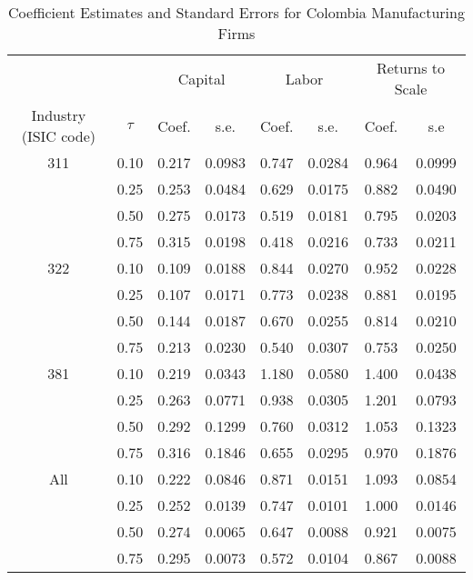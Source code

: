 \begin{table}[ht]
\centering
\caption{Coefficient Estimates and Standard Errors for Colombia Manufacturing Firms} 
\begin{tabular}{cccccccc}
  \hline\hline & & \multicolumn{2}{c}{Capital}  & \multicolumn{2}{c}{Labor} & \multicolumn{2}{c}{Returns to Scale} \\ \cmidrule(lr){3-4} \cmidrule(lr){5-6} \cmidrule(lr){7-8}Industry (ISIC code) & $\tau$ & Coef. & s.e. & Coef. & s.e. & Coef. & s.e \\ 
  \hline
311 & 0.10 & 0.217 & 0.0983 & 0.747 & 0.0284 & 0.964 & 0.0999 \\ 
   & 0.25 & 0.253 & 0.0484 & 0.629 & 0.0175 & 0.882 & 0.0490 \\ 
   & 0.50 & 0.275 & 0.0173 & 0.519 & 0.0181 & 0.795 & 0.0203 \\ 
   & 0.75 & 0.315 & 0.0198 & 0.418 & 0.0216 & 0.733 & 0.0211 \\ 
  322 & 0.10 & 0.109 & 0.0188 & 0.844 & 0.0270 & 0.952 & 0.0228 \\ 
   & 0.25 & 0.107 & 0.0171 & 0.773 & 0.0238 & 0.881 & 0.0195 \\ 
   & 0.50 & 0.144 & 0.0187 & 0.670 & 0.0255 & 0.814 & 0.0210 \\ 
   & 0.75 & 0.213 & 0.0230 & 0.540 & 0.0307 & 0.753 & 0.0250 \\ 
  381 & 0.10 & 0.219 & 0.0343 & 1.180 & 0.0580 & 1.400 & 0.0438 \\ 
   & 0.25 & 0.263 & 0.0771 & 0.938 & 0.0305 & 1.201 & 0.0793 \\ 
   & 0.50 & 0.292 & 0.1299 & 0.760 & 0.0312 & 1.053 & 0.1323 \\ 
   & 0.75 & 0.316 & 0.1846 & 0.655 & 0.0295 & 0.970 & 0.1876 \\ 
  All & 0.10 & 0.222 & 0.0846 & 0.871 & 0.0151 & 1.093 & 0.0854 \\ 
   & 0.25 & 0.252 & 0.0139 & 0.747 & 0.0101 & 1.000 & 0.0146 \\ 
   & 0.50 & 0.274 & 0.0065 & 0.647 & 0.0088 & 0.921 & 0.0075 \\ 
   & 0.75 & 0.295 & 0.0073 & 0.572 & 0.0104 & 0.867 & 0.0088 \\ 
   \hline
\end{tabular}
\end{table}
